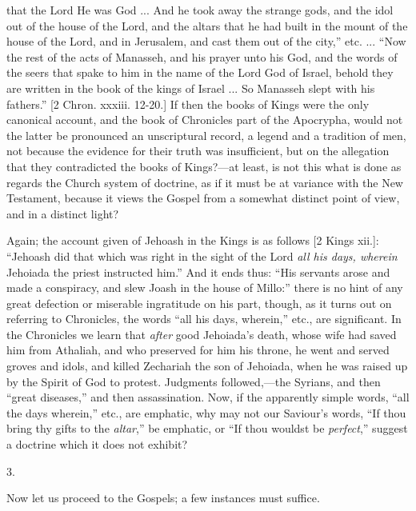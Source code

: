 that the Lord He was God ... And he took away the strange gods, and
the idol out of the house of the Lord, and the altars that he had
built in the mount of the house of the Lord, and in Jerusalem, and
cast them out of the city,'' etc. ... ``Now the rest of the
acts of Manasseh, and his prayer unto his God, and the words of the
seers that spake to him in the name of the Lord God of Israel, behold
they are written in the book of the kings of Israel ... So Manasseh
slept with his fathers.'' [2 Chron. xxxiii. 12-20.] If then the
books of Kings were the only canonical account, and the book of
Chronicles part of the Apocrypha, would not the latter be pronounced
an unscriptural record, a legend and a tradition of men, not because
the evidence for their truth was insufficient, but on the allegation
that they contradicted the books of Kings?—at least, is not
this what is done as regards the Church system of doctrine, as if it
must be at variance with the New Testament, because it views the
Gospel from a somewhat distinct point of view, and in a distinct
light?

Again; the account given of Jehoash in the Kings is as follows [2
Kings xii.]: ``Jehoash did that which was right in the sight of
the Lord \emph{all his days, wherein} Jehoiada the priest instructed
him.'' And it ends thus: ``His servants arose and made a
conspiracy, and slew Joash in the house of Millo:'' there is no
hint of any great defection or miserable ingratitude on his part,
though, as it turns out on referring to Chronicles, the words
``all his days, wherein,'' etc., are significant. In the
Chronicles we learn that \emph{after} good Jehoiada's death, whose
wife had saved him from Athaliah, and who preserved for him his
throne, he went and served groves and idols, and killed Zechariah the
son of Jehoiada, when he was raised up by the Spirit of God to
protest. Judgments followed,—the Syrians, and then ``great
diseases,'' and then assassination. Now, if the apparently simple
words, ``all the days wherein,'' etc., are emphatic, why may
not our Saviour's words, ``If thou bring thy gifts to the \emph{altar},''
be emphatic, or ``If thou wouldst be \emph{perfect},'' suggest
a doctrine which it does not exhibit?

3.

Now let us proceed to the Gospels; a few instances must suffice.

